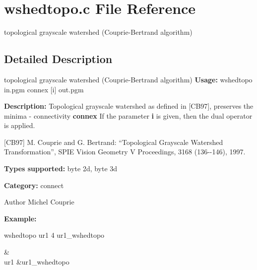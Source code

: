 \section{wshedtopo.c File Reference}
\label{wshedtopo_8c}


topological grayscale watershed (Couprie-\/Bertrand algorithm)  




\subsection{Detailed Description}
topological grayscale watershed (Couprie-\/Bertrand algorithm) {\bfseries Usage:} wshedtopo in.pgm connex [i] out.pgm

{\bfseries Description:} Topological grayscale watershed as defined in [CB97], preserves the minima -\/ connectivity {\bfseries connex} If the parameter {\bfseries i} is given, then the dual operator is applied.

[CB97] M. Couprie and G. Bertrand: ``Topological Grayscale Watershed Transformation'', SPIE Vision Geometry V Proceedings, 3168 (136-\/-\/146), 1997.

{\bfseries Types supported:} byte 2d, byte 3d

{\bfseries Category:} connect

\begin{DoxyAuthor}{Author}
Michel Couprie
\end{DoxyAuthor}
{\bfseries Example:}

wshedtopo ur1 4 ur1\_\-wshedtopo

\begin{TabularC}{2}
\hline
 &  \\
ur1 &ur1\_\-wshedtopo  \\
\end{TabularC}
